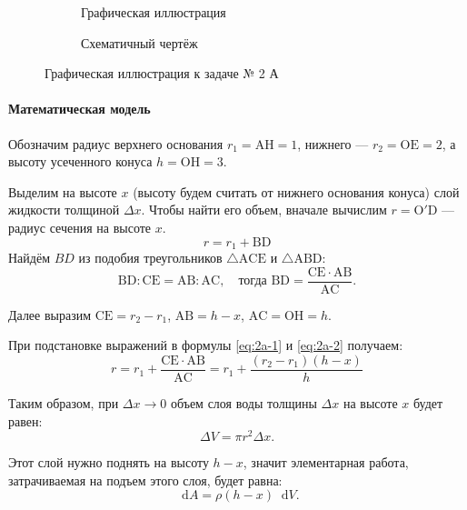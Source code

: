 \documentclass[a4paper,12pt]{article}
\newcommand*\diff{\mathop{}\!\mathrm{d}}
\begin{document}
\begin{figure}[htbp]
  \centering
  \begin{subfigure}[b]{0.47\textwidth}
    \centering
    \caption{Графическая иллюстрация}
  \end{subfigure}
  \hfill
  \begin{subfigure}[b]{0.47\textwidth}
    \centering
    \caption{Схематичный чертёж}
  \end{subfigure}
  \caption{Графическая иллюстрация к задаче № 2 А}
\end{figure}

\paragraph{Математическая модель}

Обозначим радиус верхнего основания \(r_1 = \mathrm{AH} = 1\),
нижнего --- \(r_2 = \mathrm{OE} = 2\),
а высоту усеченного конуса \(h = \mathrm{OH} = 3\).

Выделим на высоте \(x\) (высоту будем считать от нижнего основания конуса)
слой жидкости толщиной \(\Delta x\).
Чтобы найти его объем,
вначале вычислим \(r = \mathrm{O'D}\) --- радиус сечения на высоте \(x\).
\begin{equation}\label{eq:2a-1}
  r = r_1 + \mathrm{BD}
\end{equation}
Найдём \(BD\) из подобия треугольников
\(\triangle \mathrm{ACE}\) и \(\triangle \mathrm{ABD}\):
\begin{equation}\label{eq:2a-2}
  \mathrm{BD} : \mathrm{CE} = \mathrm{AB} : \mathrm{AC},
  \quad\text{тогда }
  \mathrm{BD} = \frac{\mathrm{CE} \cdot \mathrm{AB}}{\mathrm{AC}}.
\end{equation}

Далее выразим
\(\mathrm{CE} = r_2 - r_1\),
\(\mathrm{AB} = h - x\),
\(\mathrm{AC} = \mathrm{OH} = h\).

При подстановке выражений в формулы \ref{eq:2a-1} и \ref{eq:2a-2} получаем:
\[
  r = r_1 + \frac{\mathrm{CE} \cdot \mathrm{AB}}{\mathrm{AC}}
    = r_1 + \frac{(r_2 - r_1)(h - x)}{h}
\]

Таким образом, при \(\Delta x \to 0\) объем слоя воды толщины \(\Delta x\)
на высоте \(x\) будет равен:
\[\Delta V = \pi r^2 \Delta x.\]

Этот слой нужно поднять на высоту \(h - x\),
значит элементарная работа, затрачиваемая на подъем этого слоя,
будет равна:
\[\diff A = \rho (h - x) \diff V.\]
\end{document}
